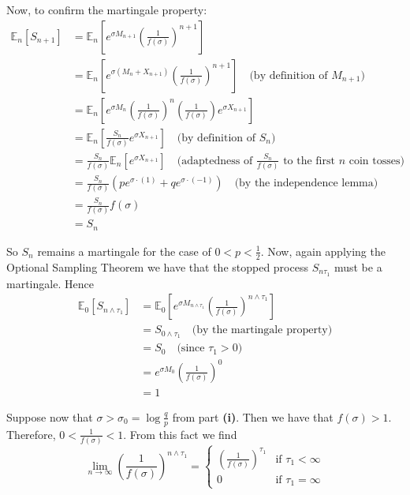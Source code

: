 \documentclass[12pt]{article}
\newlength\tindent
\renewcommand{\indent}{\hspace*{\tindent}}
\newcommand{\E}{\mathbb E}
\begin{document}
Now, to confirm the martingale property:
\begin{align*}
	\E_n \left[ S_{n + 1} \right] &= \E_n \left[ e^{\sigma M_{n + 1}} \left( \frac{1}{f(\sigma)} \right)^{n + 1} \right] \\
	&= \E_n \left[ e^{\sigma (M_n + X_{n + 1})} \left( \frac{1}{f(\sigma)} \right)^{n + 1} \right] \quad \text{(by definition of $M_{n + 1}$)} \\
	&= \E_n \left[ e^{\sigma M_n} \left( \frac{1}{f(\sigma)} \right)^n \left( \frac{1}{f(\sigma)} \right) e^{\sigma X_{n + 1}} \right] \\
	&= \E_n \left[ \frac{S_n}{f(\sigma)} e^{\sigma X_{n + 1}} \right] \quad \text{(by definition of $S_n$)} \\
	&= \frac{ S_n }{ f(\sigma) } \E_n \left[ e^{\sigma X_{n + 1}} \right] \quad \text{(adaptedness of $\frac{S_n}{f(\sigma)}$ to the first $n$ coin tosses)} \\
	&= \frac{ S_n }{ f(\sigma) } \left( pe^{\sigma \cdot (1)} + qe^{\sigma \cdot(-1)} \right) \quad \text{(by the independence lemma)} \\
	&= \frac{ S_n }{ f(\sigma) } f(\sigma) \\
	&= S_n
\end{align*}

\indent So $S_n$ remains a martingale for the case of $0 < p < \frac{1}{2}$. Now, again applying the Optional Sampling Theorem we have that the stopped process $S_{n\tau_1}$ must be a martingale. Hence
\begin{align*}
	\E_0 \left[ S_{n\land\tau_1} \right] &= \E_0 \left[ e^{\sigma M_{n\land\tau_1}} \left( \frac{1}{f(\sigma)} \right)^{n\land\tau_1} \right] \\
	&= S_{0\land\tau_1} \quad \text{(by the martingale property)} \\
	&= S_0 \quad \text{(since $\tau_1 > 0$)} \\
	&= e^{\sigma M_0} \left( \frac{1}{f(\sigma)} \right)^0 \\
	&= 1
\end{align*}

\indent Suppose now that $\sigma > \sigma_0 = \log \frac{q}{p}$ from part {\bf (i)}. Then we have that $f(\sigma) > 1$. Therefore, $0 < \frac{1}{f(\sigma)} < 1$. From this fact we find
\begin{equation*}
	\lim_{n\to\infty} \left( \frac{1}{f(\sigma)} \right)^{n\land\tau_1} =
	\begin{cases}
		\left( \frac{1}{f(\sigma)} \right)^{\tau_1} & \text{if } \tau_1 < \infty \\
		0 & \text{if } \tau_1 = \infty
	\end{cases}
\end{equation*}
\end{document}
